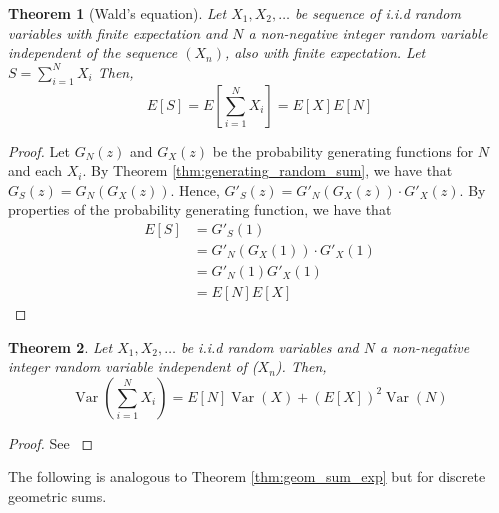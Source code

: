 \documentclass{article}
\theoremstyle{plain}
\newtheorem{theorem}{Theorem}[section]
\theoremstyle{definition}
\theoremstyle{remark}
\numberwithin{equation}{section}
\newcommand{\Var}{\operatorname {Var}}
\begin{document}
\begin{theorem}[Wald's equation]\label{thm:random_sum_ev}
Let $X_1, X_2, \ldots$ be sequence of i.i.d random variables with finite expectation and $N$ a non-negative integer random variable independent of the sequence $(X_n)$, also with finite expectation.
Let $S = \sum_{i = 1}^N X_i$
Then,
$$
E[ S ] = E\left[\sum_{i = 1}^N X_i\right] = E[X] E[N]
$$
\end{theorem}

\begin{proof}
Let $G_N(z)$ and $G_X(z)$ be the probability generating functions for $N$ and each $X_i$.
By Theorem \ref{thm:generating_random_sum}, we have that $G_S(z) = G_N(G_X(z))$.
Hence,
$G'_S(z) = G'_N(G_X(z)) \cdot G'_X(z)$.
By properties of the probability generating function, we have that
\begin{align*}
    E[S] &= G'_S(1)\\
    &= G'_N(G_X(1)) \cdot G'_X(1)\\
    &= G'_N(1) G'_X(1)\\
    &= E[N] E[X]
\end{align*}

\end{proof}

\begin{theorem} \label{thm:random_sum_var}
Let $X_1, X_2, \ldots$ be i.i.d random variables and $N$ a non-negative integer random variable independent of ($X_n$).
Then,
$$
\Var\left( \sum_{i = 1}^N X_i \right) = E[N]\Var(X) + (E[X])^2 \Var(N)
$$
\end{theorem}

\begin{proof}
See \cite{Ross97}
\end{proof}

The following is analogous to Theorem \ref{thm:geom_sum_exp} but for discrete geometric sums.
\end{document}

